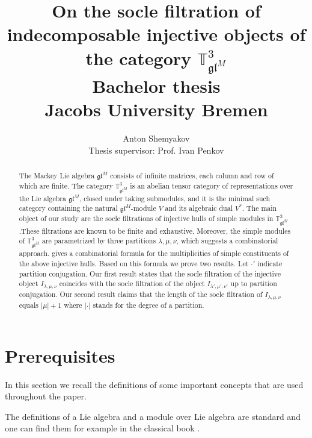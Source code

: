 \documentclass[letterpaper,11pt]{article}
\begin{document}
	
	\title{On the socle filtration of indecomposable injective objects of the category $\mathbb{T}^3_{\mathfrak{gl}^M}$ \\
	Bachelor thesis \\
	Jacobs University Bremen}
	\author{Anton Shemyakov \\
	Thesis supervisor: Prof. Ivan Penkov}
	\maketitle
	
	\begin{abstract} The Mackey Lie algebra $\mathfrak{gl}^M$ consists of infinite matrices, each column and row of which are finite. The category $\mathbb{T}^3_{\mathfrak{gl}^M}$ is an abelian tensor category of representations over the Lie algebra $\mathfrak{gl}^M$, closed under taking submodules, and it is the minimal such category containing the natural $\mathfrak{gl}^M$-module $V$ and its algebraic dual $V^*$. The main object of our study are the socle filtrations of injective hulls of simple modules in $\mathbb{T}^3_{\mathfrak{gl}^M}$.These filtrations are known to be finite and exhaustive. Moreover, the simple modules of $\mathbb{T}^3_{\mathfrak{gl}^M}$ are parametrized by three partitions $\lambda, \mu, \nu$, which suggests a combinatorial approach. \cite{mackey} gives a combinatorial formula for the multiplicities of simple constituents of the above injective hulls. Based on this formula we prove two results. Let $\cdot '$ indicate  partition conjugation. Our first result states that the socle filtration of the injective object $I_{\lambda, \mu, \nu}$ coincides with the socle filtration of the object $I_{\lambda', \mu', \nu'}$ up to partition conjugation. Our second result claims that the length of the socle filtration of $I_{\lambda, \mu, \nu}$ equals $|\mu| + 1$ where $|\cdot|$ stands for the degree of a partition.
	\end{abstract}
	
	\tableofcontents
	
	\section{Prerequisites}
	
	In this section we recall the definitions of some important concepts that are used throughout the paper.
	
	The definitions of a Lie algebra and a module over Lie algebra are standard and one can find them for example in the classical book \cite{humphreys}.
	
\end{document}
